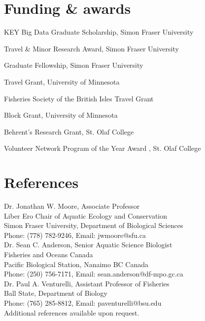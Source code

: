 \section{Funding \& awards}

\begin{description}
\tightlist

\item[2018] KEY Big Data Graduate Scholarship, Simon Fraser University 
\item[2015--18] Travel \& Minor Research Award, Simon Fraser University
\item[2016--17] Graduate Fellowship, Simon Fraser University
\item[2013] Travel Grant, University of Minnesota
\item[2013] Fisheries Society of the British Isles Travel Grant
\item[2013] Block Grant, University of Minnesota 
\item[2009] Behrent's Research Grant, St. Olaf College 
\item[2009] Volunteer Network Program of the Year Award , St. Olaf College

\end{description}


\section{References}

Dr. Jonathan W. Moore, Associate Professor\\
Liber Ero Chair of Aquatic Ecology and Conservation\\
Simon Fraser University, Department of Biological Sciences\\
Phone: (778) 782-9246,	Email: jwmoore@sfu.ca\\

Dr. Sean C. Anderson, Senior Aquatic Science Biologist\\
Fisheries and Oceans Canada\\
Pacific Biological Station, Nanaimo BC Canada\\
Phone: (250) 756-7171,	Email: sean.anderson@df-mpo.gc.ca\\

Dr. Paul A. Venturelli, Assistant Professor of Fisheries\\
Ball State, Department of Biology\\
Phone: (765) 285-8812,	Email: paventurelli@bsu.edu\\

Additional references available upon request.
